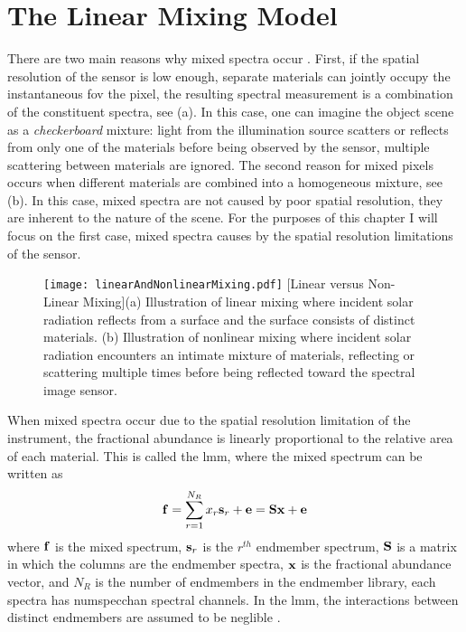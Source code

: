 \section{The Linear Mixing Model}

There are two main reasons why mixed spectra occur \cite{keshava2002spectral, keshava2003survey}. First, if the spatial resolution of the sensor is low enough, separate materials can jointly occupy the instantaneous \acrfull{fov} the pixel, the resulting spectral measurement is a combination of the constituent spectra, see (a). In this case, one can imagine the object scene as a \emph{checkerboard} mixture: light from the illumination source scatters or reflects from only one of the materials before being observed by the sensor, multiple scattering between materials are ignored. The second reason for mixed pixels occurs when different materials are combined into a homogeneous mixture, see (b). In this case, mixed spectra are not caused by poor spatial resolution, they are inherent to the nature of the scene. For the purposes of this chapter I will focus on the first case, mixed spectra causes by the spatial resolution limitations of the sensor.

\begin{figure}
	\centering
	\texttt{[image: linearAndNonlinearMixing.pdf]}
	[Linear versus Non-Linear Mixing]{(a) Illustration of linear mixing where incident solar radiation reflects from a surface and the surface consists of distinct materials. (b) Illustration of nonlinear mixing where incident solar radiation encounters an intimate mixture of materials, reflecting or scattering multiple times before being reflected toward the spectral image sensor.}
	\label{fig:linearAndNonlinearMixing}
\end{figure}

When mixed spectra occur due to the spatial resolution limitation of the instrument, the fractional abundance is linearly proportional to the relative area of each material. This is called the \acrfull{lmm}, where the mixed spectrum can be written as 
%
\begin{equation}
\displaystyle \mathbf{f} = \sum_{r=1}^{N_{R}} x_r \displaystyle \mathbf{s}_r + \displaystyle \mathbf{e} = \displaystyle \mathbf{S} \displaystyle \mathbf{x}  + \displaystyle \mathbf{e}
\end{equation}
%
where $\displaystyle \mathbf{f}$ is the \gls{mixed spectrum}, $\displaystyle \mathbf{s}_r$ is the $r^{th}$ endmember spectrum, $\displaystyle \mathbf{S}$ is a matrix in which the columns are the endmember spectra, $\displaystyle \mathbf{x}$ is the fractional abundance vector, and $N_{R}$ is the number of endmembers in the endmember library, each spectra has \gls{numspecchan} spectral channels. In the \gls{lmm}, the interactions between distinct endmembers are assumed to be neglible \cite{clark1984reflectance}. 

